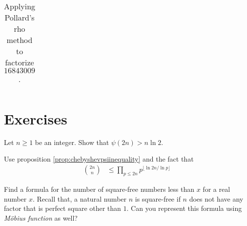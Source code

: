\documentclass{subfiles}
\begin{document}
\begin{example}
\begin{table}
\begin{tabular}{|c|c|c|c|}
					\hline
				\end{tabular}
				\caption{Applying Pollard's rho method to factorize $16843009$.}
				\label{table:pollardmodified}
		\end{table}
	\end{example}

\newpage
\section{Exercises}

	\begin{problem}
		Let $n \geq 1$ be an integer. Show that $\psi(2n) >n \ln 2$.
	\end{problem}

	\begin{hint}
		Use proposition \eqref{prop:chebyshevpsiinequality} and the fact that
			\begin{align*}
				\binom{2n}{n}
					& \leq \prod_{p \leq 2n} p^{\lfloor\ln 2n/\ln p\rfloor }
			\end{align*}
	\end{hint}

	\begin{problem}
		Find a formula for the number of square-free numbers less than $x$ for a real number $x$. Recall that, a natural number $n$ is square-free if $n$ does not have any factor that is perfect square other than $1$. Can you represent this formula using \textit{M\" obius function} as well?
	\end{problem}
\end{document}
